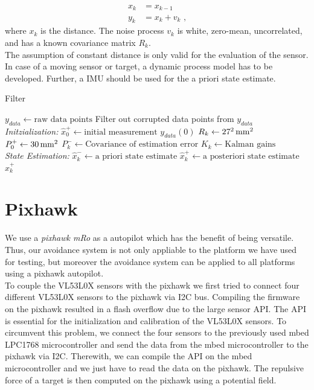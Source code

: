 \begin{equation}
\label{eq:filter}
\begin{split} 
x_k & = x_{k-1} \\
y_k & = x_k + v_k \text{ ,}
\end{split}
\end{equation}
where $x_k$ is the distance. The noise process $v_k$ is white, zero-mean, uncorrelated, and has a known covariance matrix  $R_k$.\\
The assumption of constant distance is only valid for the evaluation of the sensor. In case of a moving sensor or target, a dynamic process model has to be developed. Further, a IMU should be used for the a priori state estimate.\\
\begin{algorithm}
	\caption{Filter}\label{alg:filter}
	\begin{algorithmic}[1]
		\State $y_{data}\gets \text{raw data points}$ 
		\State Filter out corrupted data points from $y_{data}$ \\
		\textit{Initzialization:}
		\State $\hat{x}^+_0\gets\text{initial measurement }y_{data}(0)$
		\State $R_k\gets\unit[27^2]{mm^2}$ 
		\State $P^+_0\gets \unit[30]{mm^2}$ 
		\For{ each $k = (0, \text{ number of data point]}$}	
		\State  $P^-_k \gets \text{Covariance of estimation error}$
		\State	$K_k \gets \text{Kalman gains}$
		\EndFor \\
		\textit{State Estimation:}	 
		\For{ each $k = (0, \text{ number of data point]}$}
		\State {} 
		\State $\hat{x}^-_k \gets \text{a priori state estimate}$
		\State $\hat{x}^+_k \gets \text{a posteriori state estimate}$
		\EndFor
		\State \Return $\hat{x}^+_k$
		\EndProcedure
		
	\end{algorithmic}
\end{algorithm}


\section{Pixhawk}
\label{sec:pixhawk}
We use a \textit{pixhawk mRo} as a autopilot which has the benefit of being versatile. Thus, our avoidance system is not only appliable to the platform we have used for testing, but moreover the avoidance system can be applied to all platforms using a pixhawk autopilot.\\
To couple the VL53L0X sensors with the pixhawk we first tried to connect four different VL53L0X sensors to the pixhawk via I2C bus. Compiling the firmware on the pixhawk resulted in a flash overflow due to the large sensor API. The API is essential for the initialization and calibration of the VL53L0X sensors. To circumvent this problem, we connect the four sensors to the previously used mbed LPC1768 microcontroller and send the data from the mbed microcontroller to the pixhawk via I2C. Therewith, we can compile the API on the mbed microcontroller and we just have to read the data on the pixhawk. The repulsive force of a target is then computed on the pixhawk using a potential field.


